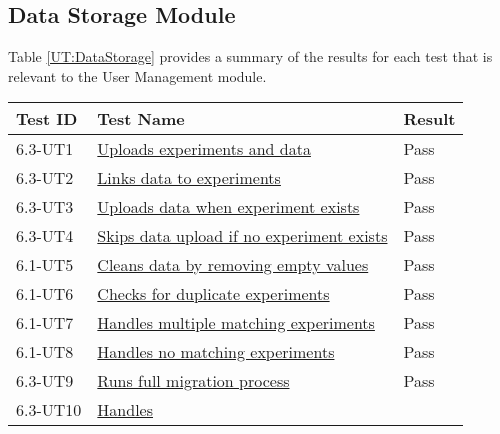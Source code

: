 \documentclass[12pt, titlepage]{article}
\begin{document}
\subsection{Data Storage Module}
Table \ref{UT:DataStorage} provides a summary of the results for each test that
is relevant to the User Management module.
\begin{table}[H]
  \centering
  \begin{tabular}{|l|l|l|}
    \hline
    \textbf{Test ID} & \textbf{Test Name} & \textbf{Result}\\
    \hline
    6.3-UT1 &
    \href{https://github.com/SumanyaG/Alkalytics/blob/main/src/backend/test/migrationServiceTest.py}{Uploads
    experiments and data} & Pass \\
    \hline
    6.3-UT2 &
    \href{https://github.com/SumanyaG/Alkalytics/blob/main/src/backend/test/migrationServiceTest.py}{Links
    data to experiments} & Pass \\
    \hline
    6.3-UT3 &
    \href{https://github.com/SumanyaG/Alkalytics/blob/main/src/backend/test/migrationServiceTest.py}{Uploads
    data when experiment exists} & Pass \\
    \hline
    6.3-UT4 &
    \href{https://github.com/SumanyaG/Alkalytics/blob/main/src/backend/test/migrationServiceTest.py}{Skips
    data upload if no experiment exists} & Pass \\
    \hline
    6.1-UT5 &
    \href{https://github.com/SumanyaG/Alkalytics/blob/main/src/backend/test/migrationServiceTest.py}{Cleans
    data by removing empty values} & Pass \\
    \hline
    6.1-UT6 &
    \href{https://github.com/SumanyaG/Alkalytics/blob/main/src/backend/test/migrationServiceTest.py}{Checks
    for duplicate experiments} & Pass \\
    \hline
    6.1-UT7 &
    \href{https://github.com/SumanyaG/Alkalytics/blob/main/src/backend/test/migrationServiceTest.py}{Handles
    multiple matching experiments} & Pass \\
    \hline
    6.1-UT8 &
    \href{https://github.com/SumanyaG/Alkalytics/blob/main/src/backend/test/migrationServiceTest.py}{Handles
    no matching experiments} & Pass \\
    \hline
    6.3-UT9 &
    \href{https://github.com/SumanyaG/Alkalytics/blob/main/src/backend/test/migrationServiceTest.py}{Runs
    full migration process} & Pass \\
    \hline
    6.3-UT10 &
    \href{https://github.com/SumanyaG/Alkalytics/blob/main/src/backend/test/migrationServiceTest.py}{Handles
}
\end{tabular}
\end{table}
\end{document}
